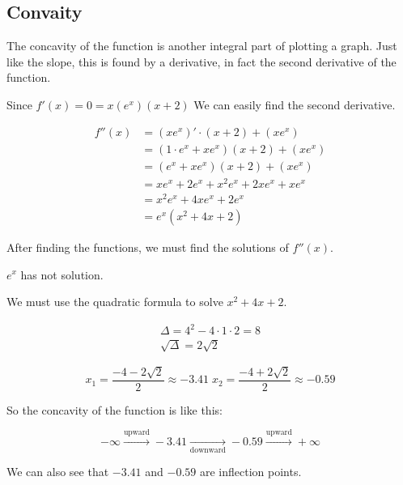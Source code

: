 \subsection{Convaity}

The concavity of the function is another integral part of plotting a graph.
Just like the slope, this is found by a derivative, in fact the second
derivative of the function.

Since \(f'(x) = 0 = x(e^x)(x+2)\) We can easily find the second derivative.

\[
    \begin{aligned}
        f''(x) & = (xe^x)'\cdot(x+2) + (xe^x) \\
        & = (1\cdot e^x + xe^x)(x+2) + (xe^x) \\
        & = (e^x + xe^x)(x+2) + (xe^x) \\
        & = xe^x + 2e^x + x^2 e^x + 2xe^x + xe^x \\
        & = x^2e^x + 4xe^x + 2e^x \\
        & = e^x(x^2 + 4x + 2)
    \end{aligned}
\]

After finding the functions, we must find the solutions of \(f''(x)\).

\(e^x\) has not solution.

We must use the quadratic formula to solve \(x^2 + 4x + 2\).

\[
    \begin{split}
        \Delta = 4^2 - 4 \cdot 1 \cdot 2 = 8 \\
        \sqrt{\Delta} = 2\sqrt{2}
    \end{split}
\]

\[
    x_1 = \frac{-4-2\sqrt{2}}{2} \approx -3.41 \; x_2 = \frac{-4+2\sqrt{2}}{2} \approx -0.59
\]

So the concavity of the function is like this:

\[
    -\infty \xrightarrow{\text{upward}} -3.41 \xrightarrow[\text{downward}]{} -0.59 \xrightarrow{\text{upward}} + \infty
\]

We can also see that \(-3.41\) and \(-0.59\) are inflection points.